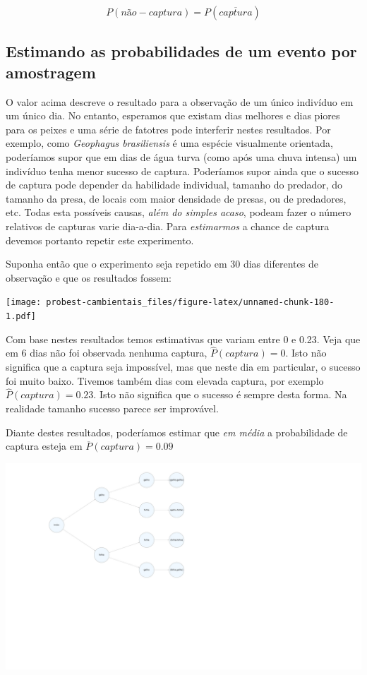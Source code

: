 \documentclass[
]{book}
\begin{document}
\[P(não-captura) = P(\overline{captura})\]

\hypertarget{estimando-as-probabilidades-de-um-evento-por-amostragem}{%
\subsection{Estimando as probabilidades de um evento por amostragem}\label{estimando-as-probabilidades-de-um-evento-por-amostragem}}

O valor acima descreve o resultado para a observação de um único indivíduo em um único dia. No entanto, esperamos que existam dias melhores e dias piores para os peixes e uma série de fatotres pode interferir nestes resultados. Por exemplo, como \emph{Geophagus brasiliensis} é uma espécie visualmente orientada, poderíamos supor que em dias de água turva (como após uma chuva intensa) um indivíduo tenha menor sucesso de captura. Poderíamos supor ainda que o sucesso de captura pode depender da habilidade individual, tamanho do predador, do tamanho da presa, de locais com maior densidade de presas, ou de predadores, etc. Todas esta possíveis causas, \emph{além do simples acaso}, podeam fazer o número relativos de capturas varie dia-a-dia. Para \emph{estimarmos} a chance de captura devemos portanto repetir este experimento.

Suponha então que o experimento seja repetido em 30 dias diferentes de observação e que os resultados fossem:

\texttt{[image: probest-cambientais\_files/figure-latex/unnamed-chunk-180-1.pdf]}

Com base nestes resultados temos estimativas que variam entre 0 e 0.23. Veja que em 6 dias não foi observada nenhuma captura, \(\hat{P}(captura) = 0\). Isto não significa que a captura seja impossível, mas que neste dia em particular, o sucesso foi muito baixo. Tivemos também dias com elevada captura, por exemplo \(\hat{P}(captura) = 0.23\). Isto não significa que o sucesso é sempre desta forma. Na realidade tamanho sucesso parece ser improvável.

Diante destes resultados, poderíamos estimar que \emph{em média} a probabilidade de captura esteja em \(\overline{P}(captura) = 0.09\)

\begin{center}\includegraphics{probest-cambientais_files/figure-latex/unnamed-chunk-181-1} \end{center}
\end{document}
